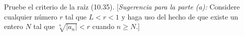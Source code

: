 \item Pruebe el criterio de la raíz (10.35). [\textit{Sugerencia para la parte (a):} Considere cualquier número $r$ tal que $L < r < 1$ y haga uso del hecho de que existe un entero $N$ tal que $\sqrt[n]{|a_n|} < r$ cuando $n \ge N$.]
